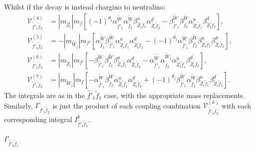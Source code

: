 \documentclass[final,3p,times]{elsarticle}
\begin{document}
Whilst if the decay is instead chargino to neutralino:
\begin{align}
\mathcal{V}_{\tilde{f'}_1 \tilde{f}_2}^{(4)} &= |m_{\tilde{Z}_i}| m_{f} \left[(-1)^{\theta_j}\alpha_{\tilde{f'}_1}^{\tilde{W}} \alpha_{\tilde{f}_2}^{\tilde{W}} \beta_{\tilde{Z}_i \tilde{f}_1}^{u} \alpha_{\tilde{Z}_i \tilde{f}_2}^{d} - \beta_{\tilde{f'}_1}^{\tilde{W}} \beta_{\tilde{f}_2}^{\tilde{W}} \alpha_{\tilde{Z}_i \tilde{f}_1}^{u} \beta_{\tilde{Z}_i \tilde{f}_2}^{d}\right] ,\\
\mathcal{V}_{\tilde{f'}_1 \tilde{f}_2}^{(5)} &= -|m_{\tilde{W}_j}|m_{f'} \left[\alpha_{\tilde{f}_2}^{\tilde{W}} \beta_{\tilde{f'}_1}^{\tilde{W}} \alpha_{\tilde{Z}_i \tilde{f}_1}^{u} \alpha_{\tilde{Z}_i \tilde{f}_2}^{d} -(-1)^{\theta_j} \alpha_{\tilde{f'}_1}^{\tilde{W}} \beta_{\tilde{f}_2}^{\tilde{W}} \beta_{\tilde{Z}_i \tilde{f}_1}^{u} \beta_{\tilde{Z}_i \tilde{f}_2}^{d}\right],\\
\mathcal{V}_{\tilde{f'}_1 \tilde{f}_2}^{(6)} &= |m_{\tilde{Z}_i}| m_{f'}\left[-\beta_{\tilde{f'}_1}^{\tilde{W}}\beta_{\tilde{f}_2}^{\tilde{W}} \beta_{\tilde{Z}_i \tilde{f}_1}^{u} \alpha_{\tilde{Z}_i \tilde{f}_2}^{d}  - \alpha_{\tilde{f'}_1}^{\tilde{W}} \alpha_{\tilde{f}_2}^{\tilde{W}_1} \alpha_{\tilde{Z}_i \tilde{f}_1}^{u} \beta_{\tilde{Z}_i \tilde{f}_2}^{d}\right], \\
\mathcal{V}_{\tilde{f'}_1 \tilde{f}_2}^{(7)} &= |m_{\tilde{W}_j}|m_{f}\left[-\alpha_{\tilde{f'}_1}^{\tilde{W}}\beta_{\tilde{f}_2}^{\tilde{W}} \alpha_{\tilde{Z}_i \tilde{f}_1}^{u} \alpha_{\tilde{Z}_i \tilde{f}_2}^{d} + (-1)^{\theta_j} \beta_{\tilde{f'}_1}^{\tilde{W}} \alpha_{\tilde{f}_2}^{\tilde{W}} \beta_{\tilde{Z}_i \tilde{f}_1}^{u} \beta_{\tilde{Z}_i \tilde{f}_2}^{d}\right].
\end{align}
The integrals are as in the $\tilde{f'}_1 \tilde{f}_1$ case, with the appropriate mass replacements. Similarly, $\Gamma_{\tilde{f'}_1 \tilde{f}_2}$ is just the product of each coupling combination $\mathcal{V}_{\tilde{f'}_1 \tilde{f}_2}^{(k)}$ with each corresponding integral $I_{\tilde{f'}_1 \tilde{f}_2}^{k}$.


\textbf{\underline{$\Gamma_{\tilde{f'}_2 \tilde{f}_1}$}}
\end{document}
